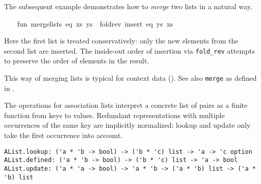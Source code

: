 \begin{isabellebody}
\begin{isamarkuptext}
The subsequent example demonstrates how to \emph{merge} two
  lists in a natural way.%
\end{isamarkuptext}%
\isamarkuptrue%
%
\isadelimML
%
\endisadelimML
%
\isatagML
{}\isamarkupfalse%
\ {}\isanewline
\ \ fun\ merge{}lists\ eq\ {}xs{}\ ys{}\ {}\ fold{}rev\ {}insert\ eq{}\ ys\ xs{}\isanewline
{}%
\endisatagML
{\isafoldML}%
%
\isadelimML
%
\endisadelimML
%
\begin{isamarkuptext}%
Here the first list is treated conservatively: only the new
  elements from the second list are inserted.  The inside-out order of
  insertion via \verb|fold_rev| attempts to preserve the order of
  elements in the result.

  This way of merging lists is typical for context data
  ().  See also \verb|merge| as defined in
  \hyperlink{file.~~/src/Pure/library.ML}{\mbox{}}.%
\end{isamarkuptext}%
\isamarkuptrue%
%
\isamarkuptrue%
%
\begin{isamarkuptext}%
The operations for association lists interpret a concrete list
  of pairs as a finite function from keys to values.  Redundant
  representations with multiple occurrences of the same key are
  implicitly normalized: lookup and update only take the first
  occurrence into account.%
\end{isamarkuptext}%
\isamarkuptrue%
%
\begin{isamarkuptext}%
\begin{mldecls}
  \verb|AList.lookup: ('a * 'b -> bool) -> ('b * 'c) list -> 'a -> 'c option| \\
  \verb|AList.defined: ('a * 'b -> bool) -> ('b * 'c) list -> 'a -> bool| \\
  \verb|AList.update: ('a * 'a -> bool) -> 'a * 'b -> ('a * 'b) list -> ('a * 'b) list| \\
  \end{mldecls}


\end{isamarkuptext}
\end{isabellebody}
